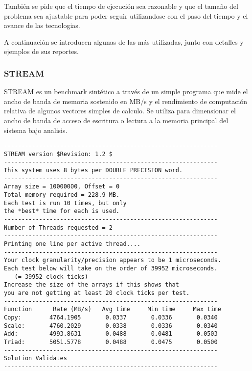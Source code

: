 \documentclass[a4paper]{report}
\begin{document}
\bigskip

Tambi\'en se pide que el tiempo de ejecuci\'on sea razonable y que el tama\~no del problema sea ajustable para poder seguir utilizandose con el paso del tiempo y el avance de las tecnologias.

\bigskip

A continuaci\'on se introducen algunas de las m\'as utilizadas, junto con detalles y ejemplos de sus reportes.

\subsubsection{STREAM}

STREAM \cite{stream} es un benchmark sint\'etico a trav\'es de un simple programa que mide el ancho de banda de memoria sostenido en MB/s y el rendimiento de computaci\'on relativa de algunos vectores simples de calculo. Se utiliza para dimensionar el ancho de banda de acceso de escritura o lectura a la memoria principal del sistema bajo analisis.

\begin{verbatim}
-------------------------------------------------------------
STREAM version $Revision: 1.2 $
-------------------------------------------------------------
This system uses 8 bytes per DOUBLE PRECISION word.
-------------------------------------------------------------
Array size = 10000000, Offset = 0
Total memory required = 228.9 MB.
Each test is run 10 times, but only
the *best* time for each is used.
-------------------------------------------------------------
Number of Threads requested = 2
-------------------------------------------------------------
Printing one line per active thread....
-------------------------------------------------------------
Your clock granularity/precision appears to be 1 microseconds.
Each test below will take on the order of 39952 microseconds.
   (= 39952 clock ticks)
Increase the size of the arrays if this shows that
you are not getting at least 20 clock ticks per test.
-------------------------------------------------------------
Function      Rate (MB/s)   Avg time     Min time     Max time
Copy:        4764.1905       0.0337       0.0336       0.0340
Scale:       4760.2029       0.0338       0.0336       0.0340
Add:         4993.8631       0.0488       0.0481       0.0503
Triad:       5051.5778       0.0488       0.0475       0.0500
-------------------------------------------------------------
Solution Validates
-------------------------------------------------------------
\end{verbatim}
\end{document}
